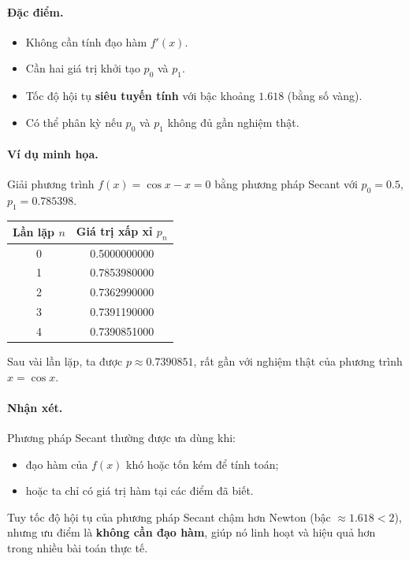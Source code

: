 \paragraph*{Đặc điểm.}
\begin{itemize}
    \item Không cần tính đạo hàm $f'(x)$.
    \item Cần hai giá trị khởi tạo $p_0$ và $p_1$.
    \item Tốc độ hội tụ \textbf{siêu tuyến tính} với bậc khoảng $1.618$ (bằng số vàng).
    \item Có thể phân kỳ nếu $p_0$ và $p_1$ không đủ gần nghiệm thật.
\end{itemize}

\paragraph*{Ví dụ minh họa.}
Giải phương trình $f(x) = \cos x - x = 0$ bằng phương pháp Secant 
với $p_0 = 0.5$, $p_1 = 0.785398$.

\begin{center}
\begin{tabular}{|c|c|}
\hline
\textbf{Lần lặp} $n$ & \textbf{Giá trị xấp xỉ} $p_n$ \\
\hline
0 & 0.5000000000 \\
1 & 0.7853980000 \\
2 & 0.7362990000 \\
3 & 0.7391190000 \\
4 & 0.7390851000 \\
\hline
\end{tabular}
\end{center}

Sau vài lần lặp, ta được $p \approx 0.7390851$, 
rất gần với nghiệm thật của phương trình $x = \cos x$.

\paragraph*{Nhận xét.}
Phương pháp Secant thường được ưa dùng khi:
\begin{itemize}
    \item đạo hàm của $f(x)$ khó hoặc tốn kém để tính toán;
    \item hoặc ta chỉ có giá trị hàm tại các điểm đã biết.
\end{itemize}
Tuy tốc độ hội tụ của phương pháp Secant chậm hơn Newton (bậc $\approx 1.618 < 2$), nhưng ưu điểm là \textbf{không cần đạo hàm}, giúp nó linh hoạt và hiệu quả hơn trong nhiều bài toán thực tế.

